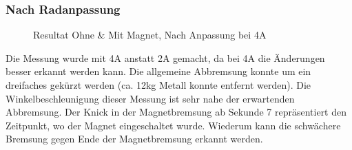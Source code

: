 \newpage
\subsubsection{Nach Radanpassung}
\begin{figure}[ht]
  \begin{center}
  \end{center}
  \vspace{-3ex}
  \caption{Resultat Ohne \& Mit Magnet, Nach Anpassung bei 4A}
  \label{fig:plot_ir_results}
\end{figure}
Die Messung wurde mit 4A anstatt 2A gemacht, da bei 4A die Änderungen besser erkannt werden kann.
\newpara
Die allgemeine Abbremsung konnte um ein dreifaches gekürzt werden (ca. 12kg Metall konnte entfernt werden). Die Winkelbeschleunigung dieser Messung ist sehr nahe der erwartenden Abbremsung. Der Knick in der Magnetbremsung ab Sekunde 7 repräsentiert den Zeitpunkt, wo der Magnet eingeschaltet wurde. Wiederum kann die schwächere Bremsung gegen Ende der Magnetbremsung erkannt werden.
